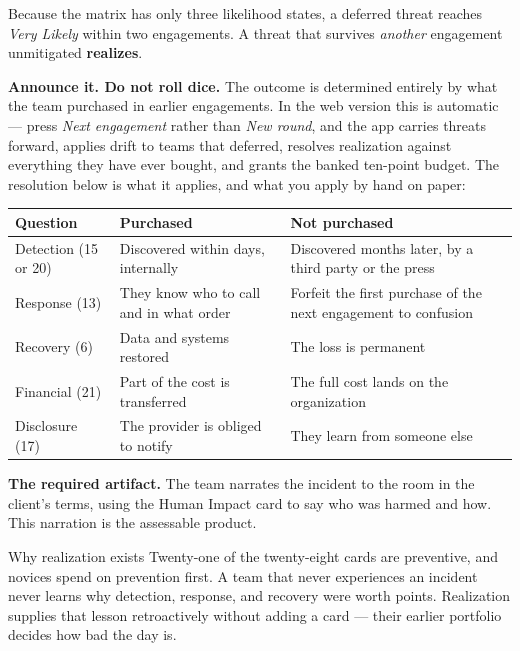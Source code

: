 \documentclass[11pt,letterpaper]{article}
\begin{document}
Because the matrix has only three likelihood states, a deferred threat reaches
\emph{Very Likely} within two engagements. A threat that survives \emph{another}
engagement unmitigated \textbf{realizes}.

\textbf{Announce it. Do not roll dice.} The outcome is determined entirely by
what the team purchased in earlier engagements. In the web version this is
automatic --- press \emph{Next engagement} rather than \emph{New round}, and the
app carries threats forward, applies drift to teams that deferred, resolves
realization against everything they have ever bought, and grants the banked
ten-point budget. The resolution below is what it applies, and what you apply by
hand on paper:

\begin{center}
\small
\begin{tabularx}{\textwidth}{@{}l X X@{}}
\toprule
\textbf{Question} & \textbf{Purchased} & \textbf{Not purchased} \\
\midrule
Detection (15 or 20) & Discovered within days, internally & Discovered months
later, by a third party or the press \\
Response (13) & They know who to call and in what order & Forfeit the first
purchase of the next engagement to confusion \\
Recovery (6) & Data and systems restored & The loss is permanent \\
Financial (21) & Part of the cost is transferred & The full cost lands on the
organization \\
Disclosure (17) & The provider is obliged to notify & They learn from someone
else \\
\bottomrule
\end{tabularx}
\end{center}

\textbf{The required artifact.} The team narrates the incident to the room in
the client's terms, using the Human Impact card to say who was harmed and how.
This narration is the assessable product.

\begin{note}{Why realization exists}
Twenty-one of the twenty-eight cards are preventive, and novices spend on
prevention first. A team that never experiences an incident never learns why
detection, response, and recovery were worth points. Realization supplies that
lesson retroactively without adding a card --- their earlier portfolio decides
how bad the day is.
\end{note}
\end{document}
